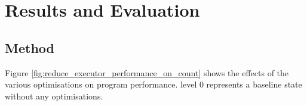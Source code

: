 \chapter{Results and Evaluation} \label{C:results}

\section{Method}


\results{}




Figure \ref{fig:reduce_executor_performance_on_count} shows the effects of the various optimisations on program performance. level 0 represents a baseline state without any optimisations.

